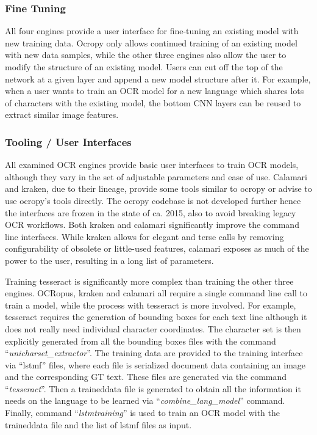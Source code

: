 \documentclass[conference]{IEEEtran}
\begin{document}
\subsubsection{Fine Tuning}

All four engines provide a user interface for fine-tuning an
existing model with new training data. Ocropy only allows
continued training of an existing model with new data samples,
while the other three engines also allow the user to modify the
structure of an existing model. Users can cut off the top of the 
network at a given layer and append a new model structure after it.
For example, when a user wants to train an OCR model for a new
language which shares lots of characters with the existing model,
the bottom CNN layers can be reused to extract similar image features.

\subsubsection{Tooling / User Interfaces}

All examined OCR engines provide basic user interfaces to
train OCR models, although they vary in the set of adjustable
parameters and ease of use. Calamari and kraken, due to their lineage,
provide some tools similar to ocropy or advise to use ocropy's tools
directly. The ocropy codebase is not developed further hence the interfaces
are frozen in the state of ca. 2015, also to avoid breaking legacy OCR
workflows. Both kraken and calamari significantly improve the command
line interfaces. While kraken allows for elegant and terse calls by
removing configurability of obsolete or little-used features, calamari
exposes as much of the power to the user, resulting in a long list
of parameters.


Training tesseract is significantly more complex than training the other three engines. 
OCRopus, kraken and calamari all require a single command line call to train
a model, while the process with tesseract is more involved.
For example, tesseract requires the generation of bounding boxes for each text 
line although it does not really need individual character coordinates. 
The character set is then explicitly generated from all the bounding boxes files with the
command ``\textit{unicharset\_extractor}''. The training data are
provided to the training interface via ``lstmf'' files, where each
file is serialized document data containing an image and the
corresponding GT text. These files are generated via the
command ``\textit{tesseract}''. Then a traineddata file is generated
to obtain all the information it needs on the language to be
learned via ``\textit{combine\_lang\_model}'' command. Finally,
command ``\textit{lstmtraining}'' is used to train an OCR model with
the traineddata file and the list of lstmf files as input.
\end{document}
